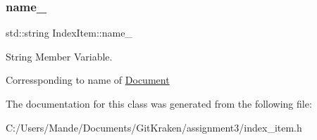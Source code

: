 \subsubsection{\texorpdfstring{name\+\_\+}{name\_}}
{\footnotesize\ttfamily std\+::string Index\+Item\+::name\+\_\+\hspace{0.3cm}{\ttfamily [protected]}}



String Member Variable. 

Corressponding to name of \hyperlink{class_document}{Document} 

The documentation for this class was generated from the following file\+:\begin{DoxyCompactItemize}
\item 
C\+:/\+Users/\+Mande/\+Documents/\+Git\+Kraken/assignment3/index\+\_\+item.\+h\end{DoxyCompactItemize}
